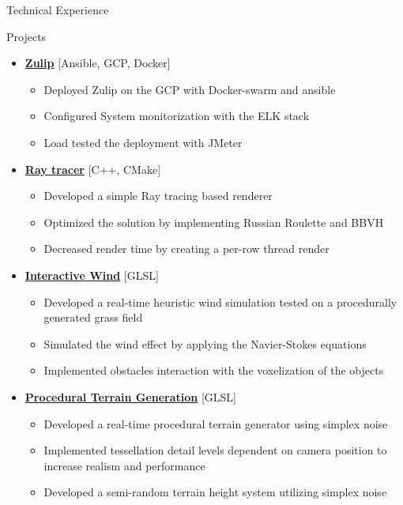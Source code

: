\documentclass[]{mcdowellcv}
\begin{document}
	\begin{cvsection}{Technical Experience}
		 \begin{cvsubsection}{Projects}{}{}
			\begin{itemize}
				\item \href{https://github.com/alves-luis/sdb-zulip_deployment}{\textbf{Zulip}} [Ansible, GCP, Docker]
                    \begin{itemize}
                        \item Deployed Zulip on the GCP with Docker-swarm and ansible
                        \item Configured System monitorization with the ELK stack
                        \item Load tested the deployment with JMeter
                        
                    \end{itemize}
				\item \href{https://github.com/goncalves-diogo/PathTracer}{\textbf{Ray tracer}} [C++, CMake]
                    \begin{itemize}
                        \item Developed a simple Ray tracing based renderer
                        \item Optimized the solution by implementing Russian Roulette and BBVH
                        \item Decreased render time by creating a per-row thread render
                    \end{itemize}	
		        \item \href{https://github.com/maacarvalho/interactive-wind}{\textbf{Interactive Wind}} [GLSL]
                  \begin{itemize}
                      \item Developed a real-time heuristic wind simulation tested on a procedurally generated grass field
                      \item Simulated the wind effect by applying the Navier-Stokes equations
                      \item Implemented obstacles interaction with the voxelization of the objects
                  \end{itemize}
                \item \href{https://github.com/maacarvalho/procedural-terrain-generation}{\textbf{Procedural Terrain Generation}} [GLSL]
                \begin{itemize}
                    \item Developed a real-time procedural terrain generator using simplex noise
                    \item Implemented tessellation detail levels dependent on camera position to increase realism and performance
                    \item Developed a semi-random terrain height system utilizing simplex noise
                \end{itemize}                
                
			\end{itemize}
		\end{cvsubsection}
	\end{cvsection}
\end{document}
